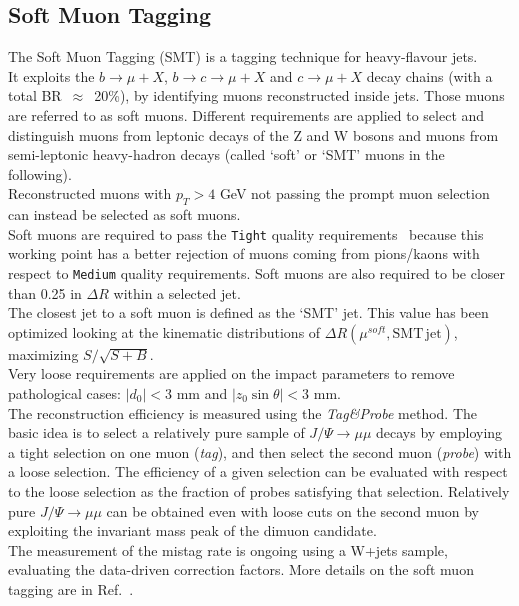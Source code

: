 \subsection{Soft Muon Tagging}
\label{sec:object:soft_muons}
\label{sec:object:smt}
The Soft Muon Tagging (SMT) is a tagging technique for heavy-flavour jets.\\
It exploits the $b \rightarrow \mu + X$,
$b \rightarrow c \rightarrow \mu + X$ and $c \rightarrow \mu + X$ decay chains (with a total BR~$\approx$~20\%), by identifying muons reconstructed inside jets. Those muons are referred to as soft muons. 
Different requirements are applied to select and distinguish muons 
from leptonic decays of the Z and W bosons 
and muons from semi-leptonic heavy-hadron decays 
(called `soft' or `SMT' muons in the following). \\
Reconstructed muons with $p_{T} > 4 $ GeV not passing 
the prompt muon selection can instead be selected as soft muons.\\
Soft muons are required to pass the \texttt{Tight} quality requirements~\cite{muon2015}
because this working point has a better rejection of muons coming from pions/kaons with respect to \texttt{Medium} quality requirements.
Soft muons are also required to be closer than 0.25 in $\Delta R$ within a selected jet.\\
The closest jet to a soft muon is defined as the `SMT' jet. 
This value has been optimized looking at the kinematic distributions of $\Delta R(\mu^{soft}, \mathrm{SMT\, jet})$, maximizing $S/\sqrt{S+B}$.\\
Very loose requirements are applied on the impact parameters to remove
pathological cases: 
$|d_0| < 3$ mm and $|z_0 \sin\theta| < 3$  mm.\\
The reconstruction efficiency is measured using the \textit{Tag\&Probe} method.
The basic idea is to select a relatively pure sample of $J/\Psi \rightarrow \mu\mu$  decays by employing a tight selection on one muon (\textit{tag}),  and then select the second muon (\textit{probe}) with a loose selection. 
The efficiency of a given selection can be evaluated with respect to the loose selection as the fraction of probes satisfying that selection. 
Relatively pure $J/\Psi \rightarrow \mu\mu$ can be obtained even with loose cuts on the second muon by exploiting the invariant mass peak of the dimuon candidate.\\
The measurement of the mistag rate is ongoing using a W+jets sample, evaluating the data-driven correction factors. More details on the soft muon tagging are in Ref.~\cite{SMT-INT-13TeV}.

